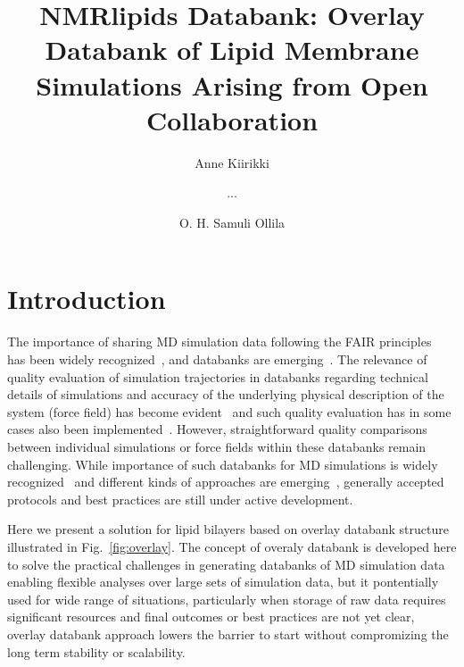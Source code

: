 \documentclass[fleqn,10pt]{wlscirep}
\title{NMRlipids Databank: Overlay Databank of Lipid Membrane Simulations Arising from Open Collaboration}
\author[1]{Anne Kiirikki}
\author[2]{...}
\author[1,*]{O. H. Samuli Ollila}
\affil[1]{University of Helsinki, Institute of Biotechonology, Helsinki, Finland}
\affil[2]{Affiliation, department, city, postcode, country}
\affil[*]{samuli.ollila@helsinki.fi}
\begin{document}
\flushbottom
\maketitle
%
%
\thispagestyle{empty}


\section{Introduction}



The importance of sharing MD simulation data following the FAIR principles~\cite{wilkinson16} has been widely recognized~\cite{feig99,tai04,silva06,abraham19,hildebrand19,hospital20,abriata20,espigares20}, and databanks are emerging~\cite{meyer10,kamp10,hospital16,mixcoha16,newport19,bekker20,espigares20,leston22}.
The relevance of quality evaluation of simulation trajectories in databanks regarding technical details of simulations and accuracy of the underlying physical description of the system (force field) has become evident~\cite{tai04,meyer10,hospital20} and such quality evaluation has in some cases also been implemented~\cite{meyer10,hospital16}. However, straightforward quality comparisons between individual simulations or force fields within these databanks remain challenging. 
While importance of such databanks for MD simulations is widely recognized~\cite{feig99,tai04,silva06,abraham19,hildebrand19,hospital20,abriata20,espigares20} and different kinds of approaches are emerging~\cite{meyer10,kamp10,hospital16,mixcoha16,newport19,bekker20,espigares20,leston22}, generally accepted protocols and best practices are still under active development.


Here we present a solution for lipid bilayers based on overlay databank structure illustrated in Fig.~\ref{fig:overlay}.  The concept of overaly databank is developed here to solve the practical challenges in generating databanks of MD simulation data enabling flexible analyses over large sets of simulation data, but it pontentially used for wide range of situations, particularly when storage of raw data requires significant resources and final outcomes or best practices are not yet clear, overlay databank approach lowers the barrier to start without compromizing the long term stability or scalability.
\end{document}
